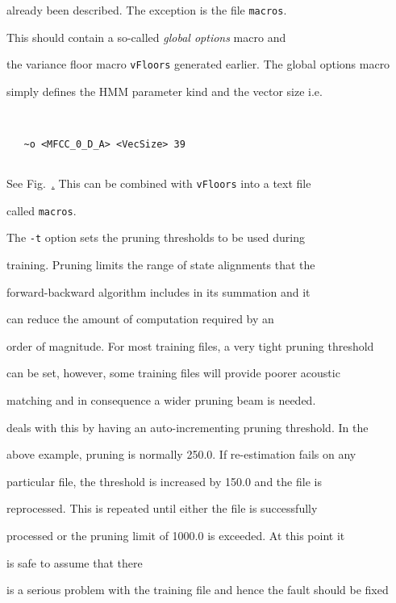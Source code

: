 already been described.  The exception is the file \texttt{macros}.


This should contain a so-called \textit{global options} macro and


the variance floor macro \texttt{vFloors} generated earlier.  The global options macro


simply defines the HMM parameter kind and the vector size i.e.


\begin{verbatim}


   ~o <MFCC_0_D_A> <VecSize> 39


\end{verbatim}


See Fig.~\href{f:MMFeg}. This can be combined with \texttt{vFloors} into a text file


called \texttt{macros}.










The \texttt{-t} option sets the pruning thresholds to be used during


training.  Pruning limits the range of state alignments that the


forward-backward algorithm includes in its summation and it


can reduce the amount of computation required by an


order of magnitude.  For most training files, a very tight pruning threshold


can be set, however, some training files will provide poorer acoustic


matching and in consequence a wider pruning beam is needed.  


deals with this by having an auto-incrementing pruning threshold.  In the


above example, pruning is normally 250.0.  If re-estimation fails on any


particular file, the threshold is increased by 150.0 and the file is


reprocessed.  This is repeated until either the file is successfully


processed or the pruning limit of 1000.0 is exceeded.  At this point it 


is safe to assume that there


is a serious problem with the training file and hence the fault should be fixed


